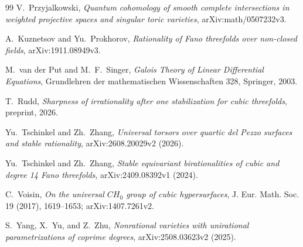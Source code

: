 \documentclass[11pt]{article}
\numberwithin{equation}{section}
\theoremstyle{definition}
\theoremstyle{remark}
\begin{document}
\begin{thebibliography}{99}
V.~Przyjalkowski,
\emph{Quantum cohomology of smooth complete intersections in weighted
projective spaces and singular toric varieties},
arXiv:math/0507232v3.

\begingroup\raggedright
A.~Kuznetsov and Yu.~Prokhorov,
\emph{Rationality of Fano threefolds over non-closed fields},
arXiv:1911.08949v3.\par\endgroup

M.~van der Put and M.~F.~Singer,
\emph{Galois Theory of Linear Differential Equations},
Grundlehren der mathematischen Wissenschaften 328, Springer, 2003.

T.~Rudd,
\emph{Sharpness of irrationality after one stabilization for cubic
threefolds}, preprint, 2026.

Yu.~Tschinkel and Zh.~Zhang,
\emph{Universal torsors over quartic del Pezzo surfaces and stable
rationality}, arXiv:2608.20029v2 (2026).

Yu.~Tschinkel and Zh.~Zhang,
\emph{Stable equivariant birationalities of cubic and degree 14 Fano
threefolds}, arXiv:2409.08392v1 (2024).

C.~Voisin,
\emph{On the universal \(CH_0\) group of cubic hypersurfaces},
J. Eur. Math. Soc. 19 (2017), 1619--1653; arXiv:1407.7261v2.

S.~Yang, X.~Yu, and Z.~Zhu,
\emph{Nonrational varieties with unirational parametrizations of coprime
degrees}, arXiv:2508.03623v2 (2025).



\end{thebibliography}
\end{document}
